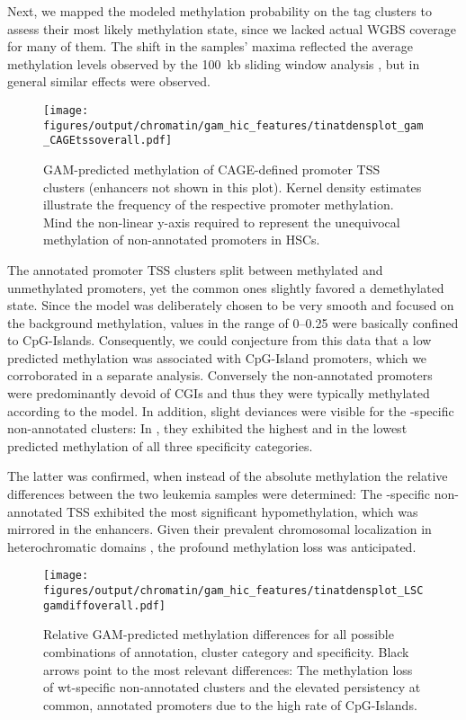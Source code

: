 Next, we mapped the modeled methylation probability on the tag clusters to assess their most likely methylation state, since we lacked actual WGBS coverage for many of them. The shift in the samples' maxima reflected the average methylation levels observed by the \SI{100}{kb} sliding window analysis , but in general similar effects were observed. 

\begin{figure}[!ht]
	\centering
	\texttt{[image: figures/output/chromatin/gam\_hic\_features/tinatdensplot\_gam\_CAGEtssoverall.pdf]} 
	\caption{GAM-predicted methylation of CAGE-defined promoter TSS clusters (enhancers not shown in this plot). Kernel density estimates illustrate the frequency of the respective promoter methylation. Mind the non-linear y-axis required to represent the unequivocal methylation of non-annotated promoters in HSCs.}
	\label{fig:tinatdensplot_gam_CAGEtssoverall}
\end{figure}

The annotated promoter TSS clusters split between methylated and unmethylated promoters, yet the common ones slightly favored a demethylated state. Since the model was deliberately chosen to be very smooth and focused on the background methylation, values in the range of \numrange{0}{0.25} were basically confined to CpG-Islands. Consequently, we could conjecture from this data that a low predicted methylation was associated with CpG-Island promoters, which we corroborated in a separate analysis\dns. Conversely the non-annotated promoters were predominantly devoid of CGIs and thus they were typically methylated according to the model. In addition, slight deviances were visible for the \dnmtwt-specific non-annotated clusters: In \dnmtwt, they exhibited the highest and in \dnmtchip the lowest predicted methylation of all three specificity categories. 

The latter was confirmed, when instead of the absolute methylation the relative differences between the two leukemia samples were determined: The \dnmtwt-specific non-annotated TSS exhibited the most significant hypomethylation, which was mirrored in the enhancers. Given their prevalent chromosomal localization in heterochromatic domains , the profound methylation loss was anticipated. 

\begin{figure}[!ht]
	\centering
	\texttt{[image: figures/output/chromatin/gam\_hic\_features/tinatdensplot\_LSCgamdiffoverall.pdf]} 
	\caption{Relative GAM-predicted methylation differences for all possible combinations of annotation, cluster category and specificity. Black arrows point to the most relevant differences: The methylation loss of wt-specific non-annotated clusters and the elevated persistency at common, annotated promoters due to the high rate of CpG-Islands.}
	\label{fig:tinatdensplot_LSCgamdiffoverall.pdf}
\end{figure}
